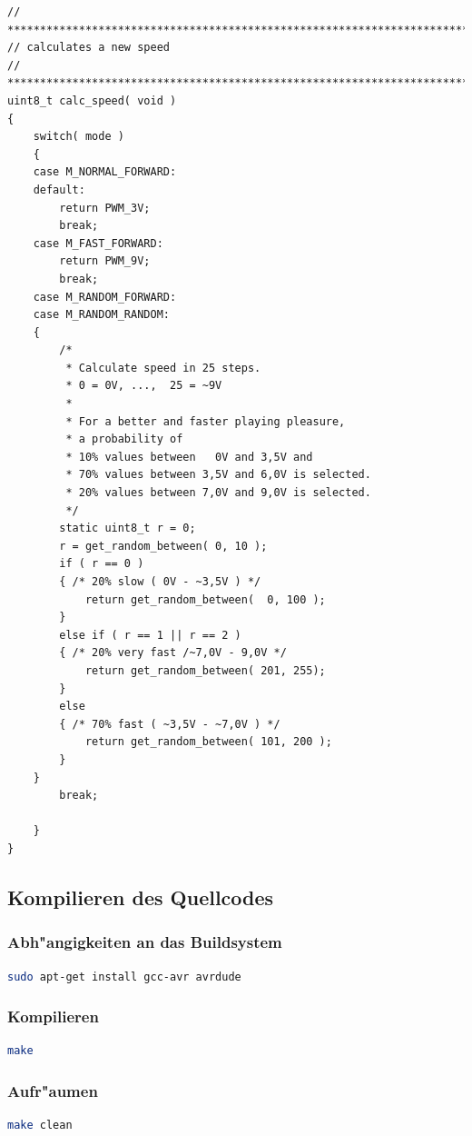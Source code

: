 \vspace{0.5cm}
\begin{lstlisting}[caption={Calculate Speed},label=lst:calcspeed]
// ****************************************************************************
// calculates a new speed
// ***************************************************************************/
uint8_t calc_speed( void )
{
	switch( mode )
	{
	case M_NORMAL_FORWARD:
	default:
		return PWM_3V;
		break;
	case M_FAST_FORWARD:
		return PWM_9V;
		break;
	case M_RANDOM_FORWARD:
	case M_RANDOM_RANDOM:
	{
		/*
		 * Calculate speed in 25 steps.
		 * 0 = 0V, ...,  25 = ~9V
		 *
		 * For a better and faster playing pleasure,
		 * a probability of
		 * 10% values between   0V and 3,5V and
		 * 70% values between 3,5V and 6,0V is selected.
		 * 20% values between 7,0V and 9,0V is selected.
		 */
		static uint8_t r = 0;
		r = get_random_between( 0, 10 );
		if ( r == 0 )
		{ /* 20% slow ( 0V - ~3,5V ) */
			return get_random_between(  0, 100 );
		}
		else if ( r == 1 || r == 2 )
		{ /* 20% very fast /~7,0V - 9,0V */
			return get_random_between( 201, 255);
		}
		else
		{ /* 70% fast ( ~3,5V - ~7,0V ) */
			return get_random_between( 101, 200 );
		}
	}
		break;

	}
}
\end{lstlisting}
\vspace{0.5cm}

\subsection{Kompilieren des Quellcodes}
\subsubsection{Abh"angigkeiten an das Buildsystem}
\begin{lstlisting}[caption={Build dependencies},language=sh,label=lst:builddep]
sudo apt-get install gcc-avr avrdude
\end{lstlisting}
\vspace{0.5cm}

\subsubsection{Kompilieren}
\begin{lstlisting}[caption={Compile},language=sh,label=lst:makeall]
make
\end{lstlisting}
\vspace{0.5cm}

\subsubsection{Aufr"aumen}
\begin{lstlisting}[caption={Clean},language=sh,label=lst:makeclean]
make clean
\end{lstlisting}
\vspace{0.5cm}

